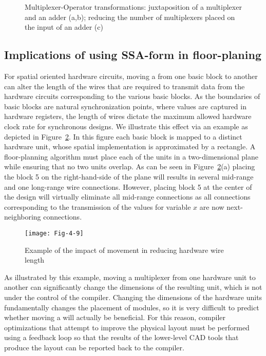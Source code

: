 \begin{figure}[thbp]
\centering
\caption{Multiplexer-Operator transformations: 
  juxtaposition of a multiplexer and an adder (a,b); 
  reducing the number of multiplexers placed on the input of an adder (c)}
\label{fig:Fig.4.8}
\end{figure}

\subsection{Implications of using SSA-form in floor-planing}
For spatial oriented hardware circuits, moving a \phifun from one basic block to another can alter the length of the wires that are required to transmit data from the hardware circuits corresponding to the various basic blocks. 
As the boundaries of basic blocks are natural synchronization points, where values are captured in hardware registers, the length of wires dictate the maximum allowed hardware clock rate for synchronous designs. 
We illustrate this effect via an example as depicted in Figure~\ref{fig:Fig.4.9}. 
In this figure each basic block is mapped to a distinct hardware unit, whose spatial implementation is approximated by a rectangle. 
A floor-planning algorithm must place each of the units in a two-dimensional plane while ensuring that no two units overlap. 
As can be seen in Figure~\ref{fig:Fig.4.9}(a) placing the block 5 on the right-hand-side of the plane will results in several mid-range and one long-range wire connections. 
However, placing block 5 at the center of the design will virtually eliminate all mid-range connections as all connections corresponding to the transmission of the values for variable $x$ are now next-neighboring connections.

\begin{figure}[thbp]
\centering
\texttt{[image: Fig-4-9]}
\caption{Example of the impact of \phifun movement in
reducing hardware wire length}
\label{fig:Fig.4.9}
\end{figure}

As illustrated by this example, moving a multiplexer from one hardware unit to another can significantly change the dimensions of the resulting unit, which is not under the control of the compiler. 
Changing the dimensions of the hardware units fundamentally changes the placement of modules, so it is very difficult to predict whether moving a \phifun will actually be beneficial. 
For this reason, compiler optimizations that attempt to improve the physical layout must be performed using a feedback loop so that the results of the lower-level CAD tools that produce the layout can be reported back to the compiler.

